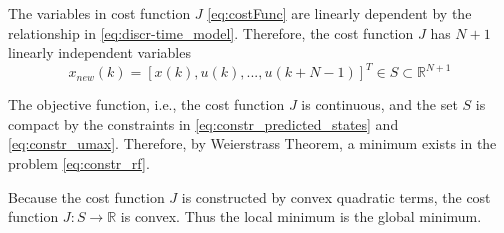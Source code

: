 \documentclass[final]{LTHtwocol} %
\begin{document}
The variables in cost function $J$ \eqref{eq:costFunc} are linearly dependent by the relationship in \eqref{eq:discr-time_model}. Therefore, the cost function $J$ has $N+1$ linearly independent variables
\begin{equation}
    x_{new}(k) = [x(k), u(k), ..., u(k+N-1)]^T \in S \subset \mathbb{R}^{N+1}
\end{equation}

The objective function, i.e., the cost function $J$ is continuous, and the set $S$ is compact by the constraints in \eqref{eq:constr_predicted_states} and \eqref{eq:constr_umax}. Therefore, by Weierstrass Theorem, a minimum exists in the problem \eqref{eq:constr_rf}.

Because the cost function $J$ is constructed by convex quadratic terms, the cost function $J:S \to \mathbb{R}$ is convex. Thus the local minimum is the global minimum.
\end{document}
